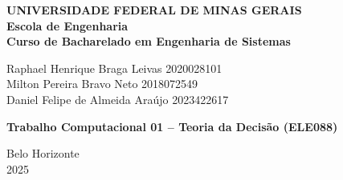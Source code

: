 \begin{center}
\textbf{UNIVERSIDADE FEDERAL DE MINAS GERAIS\\
Escola de Engenharia \\
Curso de Bacharelado em Engenharia de Sistemas}

\vspace{4cm}

Raphael Henrique Braga Leivas 2020028101 \\
Milton Pereira Bravo Neto 2018072549 \\
Daniel Felipe de Almeida Araújo 2023422617

\vspace{4cm}  

{ \textbf{Trabalho Computacional 01 – Teoria da Decisão (ELE088)} }

\vfill
{Belo Horizonte \\
2025 }
\end{center}

\newpage